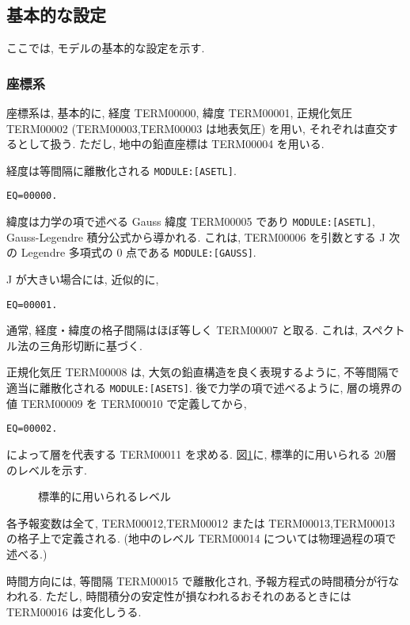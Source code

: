 ﻿
\subsection{基本的な設定}

ここでは, モデルの基本的な設定を示す.

\subsubsection{座標系}

座標系は, 基本的に,
経度 TERM00000, 緯度 TERM00001, 正規化気圧 TERM00002 
(TERM00003,TERM00003 は地表気圧)
を用い, それぞれは直交するとして扱う.
ただし, 地中の鉛直座標は TERM00004 を用いる.

経度は等間隔に離散化される \texttt{MODULE:[ASETL]}.
\begin{verbatim}
EQ=00000.
\end{verbatim}

緯度は力学の項で述べる Gauss 緯度 TERM00005 であり \texttt{MODULE:[ASETL]},
Gauss-Legendre 積分公式から導かれる.
これは, TERM00006 を引数とする
J 次の Legendre 多項式の 0 点である \texttt{MODULE:[GAUSS]}. 

J が大きい場合には, 近似的に,
\begin{verbatim}
EQ=00001.
\end{verbatim}

通常, 経度・緯度の格子間隔はほぼ等しく TERM00007 と取る. 
これは, スペクトル法の三角形切断に基づく.

正規化気圧 TERM00008 は, 大気の鉛直構造を良く表現するように,
不等間隔で適当に離散化される \texttt{MODULE:[ASETS]}.
後で力学の項で述べるように, 層の境界の値
TERM00009 を TERM00010 で定義してから,
%
\begin{verbatim}
EQ=00002.
\end{verbatim}
によって層を代表する TERM00011 を求める.
図\ref{a-setup:level}に, 標準的に用いられる 20層のレベルを示す.

\begin{figure}[hbtp]
  \begin{center}
  \end{center}
  \caption{標準的に用いられるレベル}
  \label{a-setup:level}
\end{figure}

各予報変数は全て, TERM00012,TERM00012
または TERM00013,TERM00013 の格子上で定義される.
(地中のレベル TERM00014 については物理過程の項で述べる.)

時間方向には, 等間隔 TERM00015 で離散化され,
予報方程式の時間積分が行なわれる.
ただし, 時間積分の安定性が損なわれるおそれのあるときには
TERM00016 は変化しうる.

